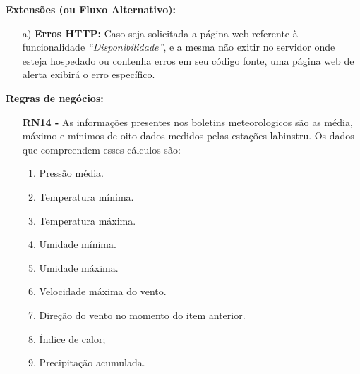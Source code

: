 \begin{mdframed}
\begin{flushleft}
		\textbf{Extensões (ou Fluxo Alternativo):}
		\begin{itemize}
			\item[a)] \textbf{Erros HTTP:} Caso seja solicitada a página web referente à funcionalidade \textit{``Disponibilidade''}, e a mesma não exitir no servidor onde esteja hospedado ou contenha erros em seu código fonte, uma página web de alerta exibirá o erro específico.
		\end{itemize}

		\textbf{Regras de negócios:}
		\begin{itemize}

			\item[] \textbf{RN14 - } As informações presentes nos boletins meteorologicos são as média, máximo e mínimos de oito dados medidos pelas estações labinstru. Os dados que compreendem esses cálculos são:
				\begin{enumerate}
					\item{Pressão média.}
					\item{Temperatura mínima.}
					\item{Temperatura máxima.}
					\item{Umidade mínima.}
					\item{Umidade máxima.}
					\item{Velocidade máxima do vento.}
					\item{Direção do vento no momento do item anterior.}
          \item Índice de calor;
					\item{Precipitação acumulada.}
				\end{enumerate}

		\end{itemize}

		\end{flushleft}

	\end{mdframed}
